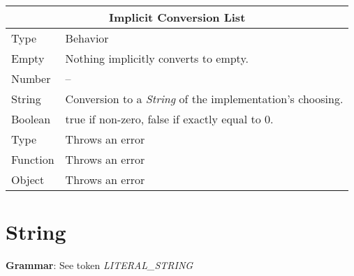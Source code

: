 \documentclass[12pt,letterpaper]{report}
\begin{document}
{
\centering
\begin{tabular}{ |p{2.5cm}||p{10cm}|  }
  \hline
  \multicolumn{2}{|c|}{Implicit Conversion List} \\
  \hline
  Type & Behavior\\
  \hline
  Empty & Nothing implicitly converts to empty.\\
  Number  & -- \\
  String & Conversion to a \textit{String} of the implementation's choosing.\\
  Boolean & true if non-zero, false if exactly equal to 0.\\
  Type & Throws an error\\
  Function & Throws an error\\
  Object & Throws an error\\
 \hline
\end{tabular}
}





\section{String}\label{String}

\textbf{Grammar}: See token \textit{LITERAL\_STRING}
\end{document}
